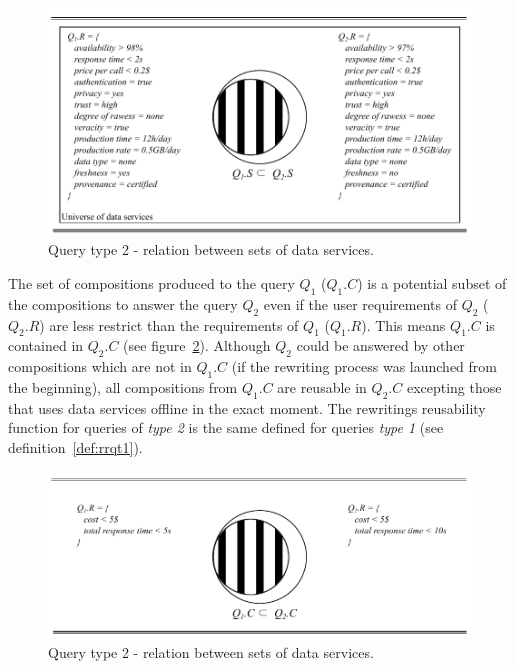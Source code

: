 \begin{figure}[!h]
\center
\includegraphics[scale=0.7]{images/QT2-DATA-SERVICES.pdf}
\caption{Query type 2 - relation between sets of data services.}
\label{fig:qt2-ds}
\end{figure}

The set of compositions produced to the query $Q_{1}$ ($Q_{1}.C$) is a potential subset of the compositions to answer the query $Q_{2}$ even if the user requirements of $Q_{2}$ ($Q_{2}.R$) are less restrict than the requirements of $Q_{1}$ ($Q_{1}.R$). 
This means $Q_{1}.C$ is contained in $Q_{2}.C$ (see figure~\ref{fig:qt2-c}).
Although $Q_{2}$ could be answered by other compositions which are not in $Q_{1}.C$ (if the rewriting process was launched from the beginning), all compositions from $Q_{1}.C$ are reusable in $Q_{2}.C$ excepting those that uses data services offline in the exact moment. 
The rewritings reusability function for queries of \textit{type 2} is the same defined for queries \textit{type 1} (see definition~\ref{def:rrqt1}). 

\begin{figure}[!h]
\center
\includegraphics[scale=0.7]{images/QT2-COMPOSITIONS.pdf}
\caption{Query type 2 - relation between sets of data services.}
\label{fig:qt2-c}
\end{figure}

